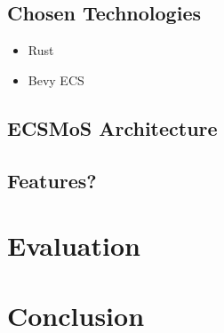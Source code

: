\documentclass[twoside, 11pt]{article}
\begin{document}
\subsection{Chosen Technologies}

\begin{itemize}
  \item Rust
  \item Bevy ECS
\end{itemize}

\subsection{ECSMoS Architecture}
\subsection{Features?}

\section{Evaluation}
\section{Conclusion}

\printbibliography
\end{document}

